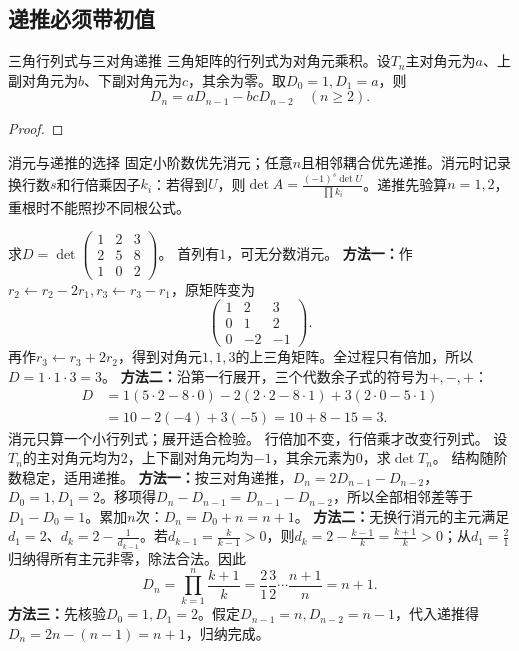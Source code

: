 \subsection{递推必须带初值}
\begin{theorem}{三角行列式与三对角递推}
三角矩阵的行列式为对角元乘积。设$T_n$主对角元为$a$、上副对角元为$b$、下副对角元为$c$，其余为零。取$D_0=1,D_1=a$，则
\begin{equation}D_n=aD_{n-1}-bcD_{n-2}\quad(n\ge2).\label{eq:trirecur}\end{equation}
\end{theorem}
\begin{proof}

\end{proof}
\begin{method}{消元与递推的选择}
固定小阶数优先消元；任意$n$且相邻耦合优先递推。消元时记录换行数$s$和行倍乘因子$k_i$：若得到$U$，则$\det A=\frac{(-1)^s\det U}{\prod k_i}$。递推先验算$n=1,2$，重根时不能照抄不同根公式。
\end{method}
{求$D=\det\begin{pmatrix}1&2&3\\2&5&8\\1&0&2\end{pmatrix}$。}
{首列有$1$，可无分数消元。}
{\textbf{方法一：}作$r_2\leftarrow r_2-2r_1,r_3\leftarrow r_3-r_1$，原矩阵变为
\[\begin{pmatrix}1&2&3\\0&1&2\\0&-2&-1\end{pmatrix}.
\]
再作$r_3\leftarrow r_3+2r_2$，得到对角元$1,1,3$的上三角矩阵。全过程只有倍加，所以$D=1\cdot1\cdot3=3$。
\textbf{方法二：}沿第一行展开，三个代数余子式的符号为$+,-,+$：
\[\begin{aligned}D&=1(5\cdot2-8\cdot0)-2(2\cdot2-8\cdot1)+3(2\cdot0-5\cdot1)\\&=10-2(-4)+3(-5)=10+8-15=3.\end{aligned}\]}
{消元只算一个小行列式；展开适合检验。}
{行倍加不变，行倍乘才改变行列式。}
{设$T_n$的主对角元均为$2$，上下副对角元均为$-1$，其余元素为$0$，求$\det T_n$。}
{结构随阶数稳定，适用递推。}
{\textbf{方法一：}按三对角递推，$D_n=2D_{n-1}-D_{n-2}$，$D_0=1,D_1=2$。移项得$D_n-D_{n-1}=D_{n-1}-D_{n-2}$，所以全部相邻差等于$D_1-D_0=1$。累加$n$次：$D_n=D_0+n= n+1$。
\textbf{方法二：}无换行消元的主元满足$d_1=2$、$d_k=2-\frac{1}{d_{k-1}}$。若$d_{k-1}=\frac{k}{k-1}>0$，则$d_k=2-\frac{k-1}{k}=\frac{k+1}{k}>0$；从$d_1=\frac{2}{1}$归纳得所有主元非零，除法合法。因此
\[D_n=\prod_{k=1}^n\dfrac{k+1}{k}=\dfrac21\dfrac32\cdots\dfrac{n+1}{n}=n+1.\]
\textbf{方法三：}先核验$D_0=1,D_1=2$。假定$D_{n-1}=n,D_{n-2}=n-1$，代入递推得$D_n=2n-(n-1)=n+1$，归纳完成。}
